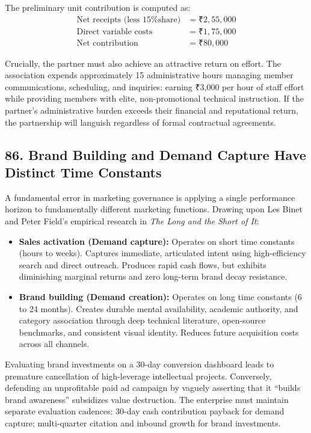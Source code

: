 The preliminary unit contribution is computed as:
\begin{align*}
  \text{Net receipts (less 15\% share)} &= \text{₹}2,55,000 \\
  \text{Direct variable costs} &= \text{₹}1,75,000 \\
  \hline
  \text{Net contribution} &= \text{₹}80,000
\end{align*}

Crucially, the partner must also achieve an attractive return on effort. The association expends approximately 15 administrative hours managing member communications, scheduling, and inquiries: earning ₹3,000 per hour of staff effort while providing members with elite, non-promotional technical instruction. If the partner's administrative burden exceeds their financial and reputational return, the partnership will languish regardless of formal contractual agreements.

\subsection*{86. Brand Building and Demand Capture Have Distinct Time Constants}

A fundamental error in marketing governance is applying a single performance horizon to fundamentally different marketing functions. Drawing upon Les Binet and Peter Field's empirical research in \textit{The Long and the Short of It}:
\begin{itemize}[leftmargin=*,itemsep=1pt]
  \item \textbf{Sales activation (Demand capture):} Operates on short time constants (hours to weeks). Captures immediate, articulated intent using high-efficiency search and direct outreach. Produces rapid cash flows, but exhibits diminishing marginal returns and zero long-term brand decay resistance.
  \item \textbf{Brand building (Demand creation):} Operates on long time constants (6 to 24 months). Creates durable mental availability, academic authority, and category association through deep technical literature, open-source benchmarks, and consistent visual identity. Reduces future acquisition costs across all channels.
\end{itemize}

Evaluating brand investments on a 30-day conversion dashboard leads to premature cancellation of high-leverage intellectual projects. Conversely, defending an unprofitable paid ad campaign by vaguely asserting that it ``builds brand awareness'' subsidizes value destruction. The enterprise must maintain separate evaluation cadences: 30-day cash contribution payback for demand capture; multi-quarter citation and inbound growth for brand investments.

